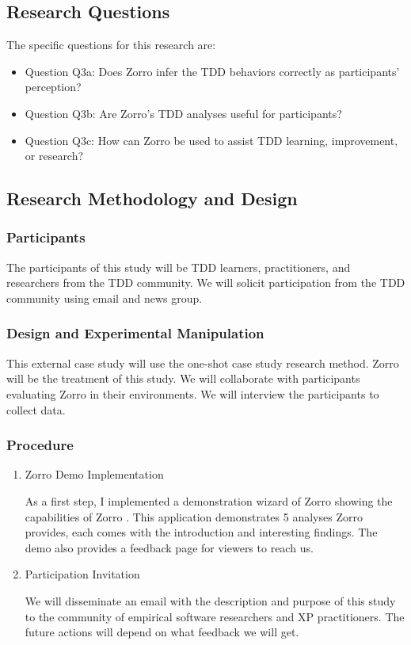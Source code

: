 \subsection{Research Questions}
The specific questions for this research are:
\begin{itemize}
\item Question Q3a: Does Zorro infer the TDD behaviors correctly as
participants' perception?
\item Question Q3b: Are Zorro's TDD analyses useful for participants?
\item Question Q3c: How can Zorro be used to assist TDD learning,
improvement, or research?
\end{itemize}

\subsection{Research Methodology and Design}
\subsubsection{Participants}
The participants of this study will be TDD learners, practitioners,
and researchers from the TDD community. We will solicit participation 
from the TDD community using email and news group.

\subsubsection{Design and Experimental Manipulation}
This external case study will use the one-shot case study research
method. Zorro will be the treatment of this study. We will collaborate
with participants evaluating Zorro in their environments. We will
interview the participants to collect data. 

\subsubsection{Procedure}
\begin{enumerate}
\item Zorro Demo Implementation 

As a first step, I implemented a demonstration wizard of Zorro
showing the capabilities of Zorro \cite{ZorroDemo:06}. This
application demonstrates 5 analyses Zorro provides, each comes with
the introduction and interesting findings. The demo also provides a
feedback page for viewers to reach us.

\item Participation Invitation

We will disseminate an email with the description and purpose of this
study to the community of empirical software researchers and XP
practitioners. The future actions will depend on what feedback we will
get.
\end{enumerate}